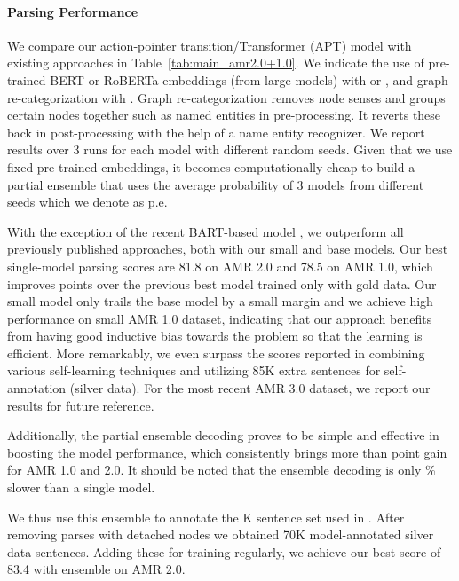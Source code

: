 \paragraph{Parsing Performance}
We compare our action-pointer transition/Transformer (APT) model with existing approaches in Table~\ref{tab:main_amr2.0+1.0}\footnotemark{}.
We indicate the use of pre-trained BERT or RoBERTa embeddings (from large models) with  or , and graph re-categorization with . Graph re-categorization \cite{lyu2018amr,zhang2019amr, cai2020amr,bevilacqua2021one} removes node senses and groups certain nodes together such as named entities in pre-processing. It reverts these back in post-processing with the help of a name entity recognizer.
We report results over 3 runs for each model with different random seeds. Given that we use fixed pre-trained embeddings, it becomes computationally cheap to build a partial ensemble that uses the average probability of 3 models from different seeds which we denote as p.e.

With the exception of the recent BART-based model \citet{bevilacqua2021one},
we outperform all previously published approaches, both with our small and base models. Our best single-model parsing scores are 81.8 on AMR 2.0 and 78.5 on AMR 1.0, which improves  points over the previous best model trained only with gold data.
Our small model only trails the base model by a small margin and 
we achieve high performance on small AMR 1.0 dataset,
indicating that our approach benefits from having good inductive bias towards the problem so that the learning is efficient.
More remarkably, we even surpass the scores reported in \citet{lee2020pushing} combining various self-learning techniques and utilizing 85K extra sentences for self-annotation (silver data). 
For the most recent AMR 3.0 dataset, we report our results for future reference.

Additionally, the partial ensemble decoding proves to be simple and effective in boosting the model performance, which consistently brings more than  point gain for AMR 1.0 and 2.0. It should be noted that the ensemble decoding is only \% slower than a single model. 

We thus use this ensemble to annotate the K sentence set used in \cite{lee2020pushing}. After removing parses with detached nodes we obtained 70K model-annotated silver data sentences. Adding these for training regularly, we achieve our best score of 83.4 with ensemble on AMR 2.0.

